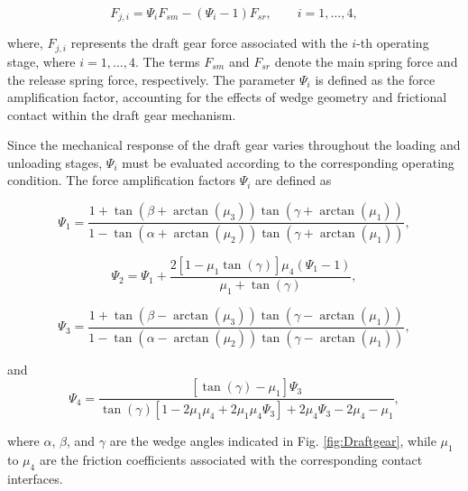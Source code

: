 \documentclass[preprint,10pt]{elsarticle}
\begin{document}
\begin{equation}
\label{eq:DRAF1}
F_{j,i}
=
\Psi_i F_{sm}
-
\left(\Psi_i - 1\right)F_{sr},
\qquad i=1,\ldots,4,
\end{equation}

\noindent where, $F_{j,i}$ represents the draft gear force associated with the $i$-th operating stage, where $i=1,\ldots,4$. The terms $F_{sm}$ and $F_{sr}$ denote the main spring force and the release spring force, respectively. The parameter $\Psi_i$ is defined as the force amplification factor, accounting for the effects of wedge geometry and frictional contact within the draft gear mechanism.

Since the mechanical response of the draft gear varies throughout the loading and unloading stages, $\Psi_i$ must be evaluated according to the corresponding operating condition. The force amplification factors $\Psi_i$ are defined as


\begin{equation}
\label{eq:DRAF2}
\Psi_1
=
\frac{
1+
\tan\left(\beta+\arctan\left(\mu_3\right)\right)
\tan\left(\gamma+\arctan\left(\mu_1\right)\right)
}{
1-
\tan\left(\alpha+\arctan\left(\mu_2\right)\right)
\tan\left(\gamma+\arctan\left(\mu_1\right)\right)
},
\end{equation}

\begin{equation}
\label{eq:DRAF3}
\Psi_2
=
\Psi_1
+
\frac{
2\left[1-\mu_1\tan\left(\gamma\right)\right]\mu_4
\left(\Psi_1-1\right)
}{
\mu_1+\tan\left(\gamma\right)
},
\end{equation}

\begin{equation}
\label{eq:DRAF4}
\Psi_3
=
\frac{
1+
\tan\left(\beta-\arctan\left(\mu_3\right)\right)
\tan\left(\gamma-\arctan\left(\mu_1\right)\right)
}{
1-
\tan\left(\alpha-\arctan\left(\mu_2\right)\right)
\tan\left(\gamma-\arctan\left(\mu_1\right)\right)
},
\end{equation}

\noindent and
\begin{equation}
\label{eq:DRAF5}
\Psi_4
=
\frac{
\left[\tan\left(\gamma\right)-\mu_1\right]\Psi_3
}{
\tan\left(\gamma\right)
\left[
1-2\mu_1\mu_4+2\mu_1\mu_4\Psi_3
\right]
+
2\mu_4\Psi_3
-
2\mu_4
-
\mu_1
},
\end{equation}

\noindent where $\alpha$, $\beta$, and $\gamma$ are the wedge angles indicated in Fig. \ref{fig:Draftgear}, while $\mu_1$ to $\mu_4$ are the friction coefficients associated with the corresponding contact interfaces.
\end{document}
